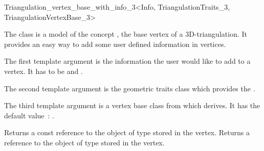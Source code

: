 

\begin{ccRefClass}{Triangulation_vertex_base_with_info_3<Info, TriangulationTraits_3, TriangulationVertexBase_3>}

\ccDefinition

The class  is a model of the concept
, the base vertex of a 3D-triangulation.
It provides an easy way to add some user defined information in vertices.


\ccParameters

The first template argument is the information the user would like to add
to a vertex.  It has to be  and .

The second template argument is the geometric traits class
 which provides the .

The third template argument is a vertex base class from which
 derives.  It has the default
value~: .

\ccIsModel {}

\ccInheritsFrom {}

\ccTypes
{}


\ccAccessFunctions
{}
\ccTagFullDeclarations

{Returns a const reference to the object of type  stored in the
vertex.}
\ccGlue
{}
{Returns a reference to the object of type  stored in the vertex.}
\ccSeeAlso

\\

\end{ccRefClass}
